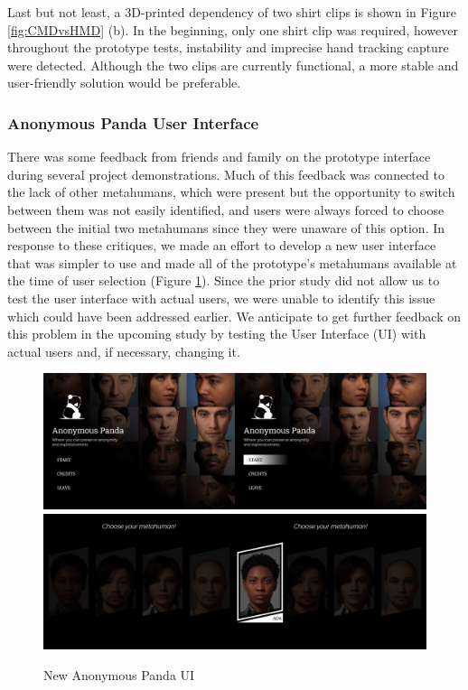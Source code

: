 Last but not least, a 3D-printed dependency of two shirt clips is shown in Figure \ref{fig:CMDvsHMD} (b). In the beginning, only one shirt clip was required, however throughout the prototype tests, instability and imprecise hand tracking capture were detected. Although the two clips are currently functional, a more stable and user-friendly solution would be preferable.

\subsubsection{Anonymous Panda User Interface}
There was some feedback from friends and family on the prototype interface during several project demonstrations. Much of this feedback was connected to the lack of other metahumans, which were present but the opportunity to switch between them was not easily identified, and users were always forced to choose between the initial two metahumans since they were unaware of this option.
In response to these critiques, we made an effort to develop a new user interface that was simpler to use and made all of the prototype's metahumans available at the time of user selection (Figure \ref{fig:newUI}). Since the prior study did not allow us to test the user interface with actual users, we were unable to identify this issue which could have been addressed earlier. We anticipate to get further feedback on this problem in the upcoming study by testing the User Interface (UI) with actual users and, if necessary, changing it.

\begin{figure}[!htb]
\includegraphics[width=\textwidth]{figures/startMenu.png}
\includegraphics[width=\textwidth]{figures/metahumanMenu.png}
\centering
\caption{New Anonymous Panda UI}
\label{fig:newUI}
\end{figure}

